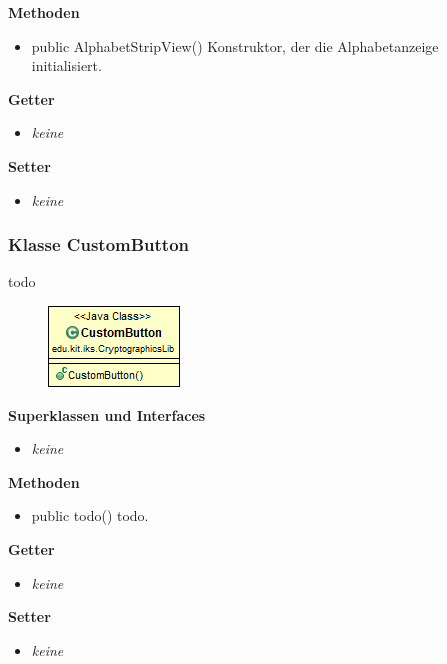 \documentclass{article}
\begin{document}
      \textbf{Methoden}
      \begin{itemize}
        \item public AlphabetStripView() \newline
          Konstruktor, der die Alphabetanzeige initialisiert.
      \end{itemize}
      
      \textbf{Getter}
      \begin{itemize}
		\item \textit{keine}
      \end{itemize}
      
      \textbf{Setter}
      \begin{itemize}
        \item \textit{keine}
      \end{itemize}
	
	\subsubsection{Klasse CustomButton}
	  todo
	
      \begin{figure}[H]
        \centering
        \includegraphics{resources/edu-kit-iks-CryptographicsLib-CustomButton}
      \end{figure}
	
      \textbf{Superklassen und Interfaces}
      \begin{itemize}
        \item \textit{keine}
      \end{itemize}
	
      \textbf{Methoden}
      \begin{itemize}
        \item public todo() \newline
          todo.
      \end{itemize}
      
      \textbf{Getter}
      \begin{itemize}
		\item \textit{keine}
      \end{itemize}
      
      \textbf{Setter}
      \begin{itemize}
        \item \textit{keine}
      \end{itemize}
	
\end{document}
